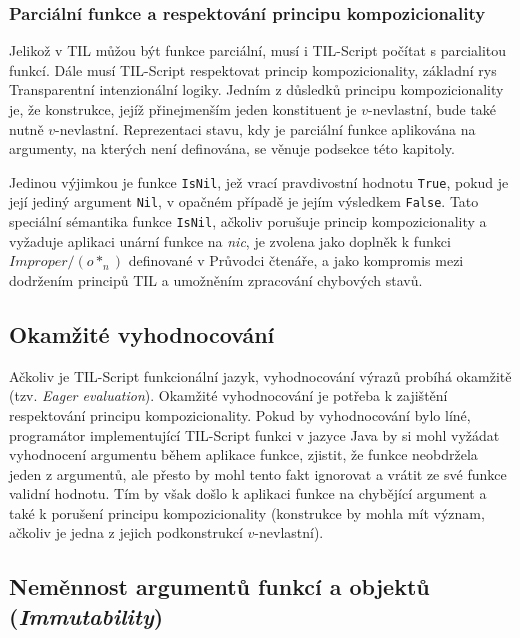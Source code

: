 \subsubsection{Parciální funkce a respektování principu kompozicionality}

Jelikož v TIL můžou být funkce parciální, musí i TIL-Script počítat s parcialitou funkcí. Dále musí
TIL-Script respektovat princip kompozicionality, základní rys Transparentní intenzionální logiky.
Jedním z důsledků principu kompozicionality je, že konstrukce, jejíž přinejmenším jeden konstituent
je $v$-nevlastní, bude také nutně $v$-nevlastní. Reprezentaci stavu, kdy je parciální funkce
aplikována na argumenty, na kterých není definována, se věnuje podsekce 
této kapitoly. 

Jedinou výjimkou je funkce \lstinline{IsNil}, jež vrací pravdivostní hodnotu \lstinline{True},
pokud je její jediný argument \lstinline{Nil}, v opačném případě je jejím výsledkem
\lstinline{False}. Tato speciální sémantika funkce \lstinline{IsNil}, ačkoliv porušuje princip
kompozicionality a vyžaduje aplikaci unární funkce na \textit{nic}, je zvolena jako doplněk
k funkci $Improper/(o*_n)$ definované v Průvodci čtenáře\cite{til-duzi}, a jako kompromis mezi
dodržením principů TIL a umožněním zpracování chybových stavů.

\subsection{Okamžité vyhodnocování}

Ačkoliv je TIL-Script funkcionální jazyk, vyhodnocování výrazů probíhá okamžitě
(tzv. \textit{Eager evaluation}). Okamžité vyhodnocování je potřeba k zajištění respektování
principu kompozicionality. Pokud by vyhodnocování bylo líné, programátor implementující TIL-Script
funkci v jazyce Java by si mohl vyžádat vyhodnocení argumentu během aplikace funkce, zjistit,
že funkce neobdržela jeden z argumentů, ale přesto by mohl tento fakt ignorovat a vrátit ze své
funkce validní hodnotu. Tím by však došlo k aplikaci funkce na chybějící argument a také k porušení
principu kompozicionality (konstrukce by mohla mít význam, ačkoliv je jedna z jejich podkonstrukcí
$v$-nevlastní).

\subsection{Neměnnost argumentů funkcí a objektů (\textit{Immutability})}

